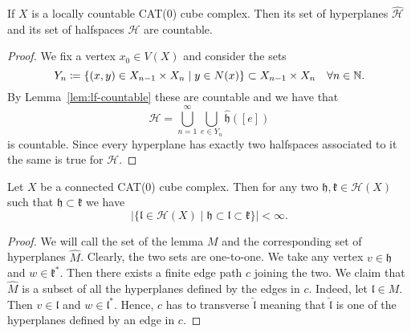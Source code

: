 
\begin{cor}
  If \(X\) is a locally countable CAT(0) cube complex. Then its set of hyperplanes \(\mathcal{\hat H}\) and its set of halfspaces \(\mathcal{H}\) are countable.
\end{cor}

\begin{proof}
  We fix a vertex \(x_0 \in V(X)\) and consider the sets
  \[
    Y_n \coloneqq \{(x,y) \in X_{n-1} \times X_{n} \mid y \in N(x)\} \subset X_{n-1} \times X_n \quad \forall n \in \mathbb{N}.
  \]
  By Lemma~\ref{lem:lf-countable} these are countable and we have that
  \[
    \mathcal{\hat H} = \bigcup_{n=1}^\infty \bigcup_{e \in Y_n} \mathfrak{\hat h}([e])
  \]
  is countable. Since every hyperplane has exactly two halfspaces associated to it the same is true for \(\mathcal{H}\).
\end{proof}


\begin{lemma}
  \label{lem:finite-interval}
  Let \(X\) be a connected CAT(0) cube complex. Then for any two \(\mathfrak{h,k} \in \mathcal{H}(X)\) such that \(\mathfrak{h} \subset \mathfrak{k}\) we have
  \[
    |\{\mathfrak{l} \in \mathcal{H}(X) \mid \mathfrak{h} \subset \mathfrak{l} \subset \mathfrak{k}\}| < \infty.
  \]
\end{lemma}

\begin{proof}
  We will call the set of the lemma \(M\) and the corresponding set of hyperplanes \(\hat M\). Clearly, the two sets are one-to-one. We take any vertex \(v \in \mathfrak{h}\)  and \(w \in \mathfrak{k}^\ast\). Then there exists a finite edge path \(c\) joining the two. We claim that \(\hat M\) is a subset of all the hyperplanes defined by the edges in \(c\). Indeed, let \(\mathfrak{l} \in M\). Then \(v \in \mathfrak{l}\) and \(w \in \mathfrak{l}^\ast\). Hence, \(c\) has to transverse \(\mathfrak{\hat l}\) meaning that \(\mathfrak{\hat l}\) is one of the hyperplanes defined by an edge in \(c\).
\end{proof}

